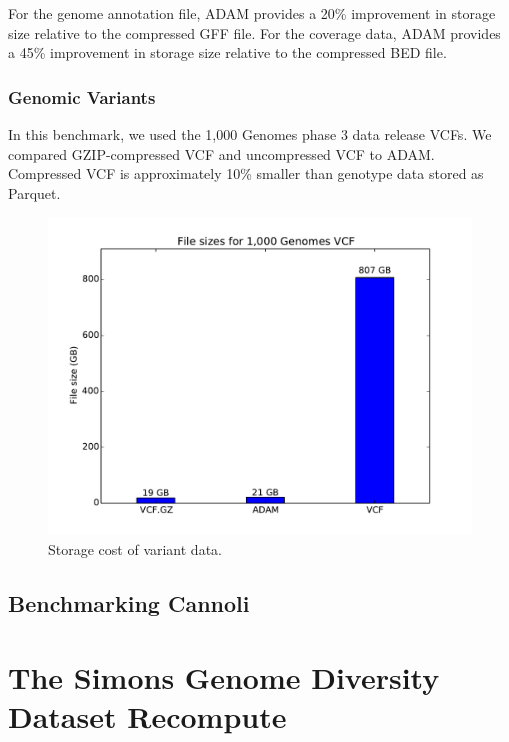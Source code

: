 \documentclass[phd]{ucbthesis}
\begin{document}
For the genome annotation file, ADAM provides a 20\% improvement in storage size
relative to the compressed GFF file.
For the coverage data, ADAM provides a 45\% improvement in storage size relative
to the compressed BED file.

\subsection{Genomic Variants}
\label{variant-storage}

In this benchmark, we used the 1,000 Genomes phase 3 data release VCFs. We
compared GZIP-compressed VCF and uncompressed VCF to ADAM.
Compressed VCF is approximately 10\% smaller than genotype data stored as
Parquet.

\begin{figure}[h]
  \begin{center}
    \includegraphics[width=0.95\linewidth]{graphs/vcf.pdf}
  \end{center}
  \caption{Storage cost of variant data.}
  \label{fig:variant-storage}
\end{figure}

\section{Benchmarking {Cannoli}}
\label{sec:benchmarking-cannoli}

\chapter{The Simons Genome Diversity Dataset Recompute}
\label{chap:sgdd}
\end{document}
